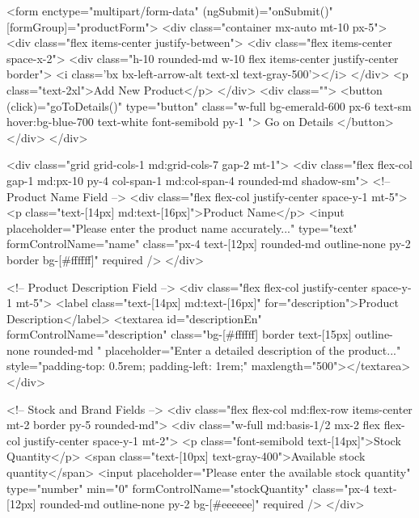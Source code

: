 <form enctype="multipart/form-data" (ngSubmit)="onSubmit()" [formGroup]="productForm">
    <div class="container mx-auto mt-10 px-5">
      <div class="flex items-center justify-between">
       <div class="flex items-center space-x-2">
        <div class="h-10 rounded-md w-10 flex items-center justify-center border">
          <i class='bx bx-left-arrow-alt text-xl text-gray-500'></i>
        </div>
        <p class="text-2xl">Add New Product</p>
       </div>
        <div class="">
          <button (click)="goToDetails()" type="button" 
            class="w-full bg-emerald-600 px-6 text-sm  hover:bg-blue-700 text-white font-semibold py-1 ">
            Go on Details
          </button>
        </div>
      </div>
  
      <div class="grid grid-cols-1 md:grid-cols-7 gap-2 mt-1">
        <div class="flex flex-col gap-1 md:px-10 py-4 col-span-1 md:col-span-4 rounded-md shadow-sm">
          <!-- Product Name Field -->
          <div class="flex flex-col justify-center space-y-1 mt-5">
            <p class="text-[14px] md:text-[16px]">Product Name</p>
            <input placeholder="Please enter the product name accurately..." type="text" formControlName="name"
              class="px-4 text-[12px] rounded-md outline-none py-2 border bg-[#ffffff]" required />
          </div>
  
          <!-- Product Description Field -->
          <div class="flex flex-col justify-center space-y-1 mt-5">
            <label class="text-[14px] md:text-[16px]" for="description">Product Description</label>
            <textarea id="descriptionEn" formControlName="description"
              class="bg-[#ffffff] border text-[15px] outline-none rounded-md "
              placeholder="Enter a detailed description of the product..."
              style="padding-top: 0.5rem; padding-left: 1rem;" maxlength="500"></textarea>
          </div>
  
          <!-- Stock and Brand Fields -->
          <div class="flex flex-col md:flex-row items-center mt-2 border py-5 rounded-md">
            <div class="w-full md:basis-1/2 mx-2 flex flex-col justify-center space-y-1 mt-2">
              <p class="font-semibold text-[14px]">Stock Quantity</p>
              <span class="text-[10px] text-gray-400">Available stock quantity</span>
              <input placeholder="Please enter the available stock quantity" type="number" min="0"
                formControlName="stockQuantity" class="px-4 text-[12px] rounded-md outline-none py-2 bg-[#eeeeee]"
                required />
            </div>
  
